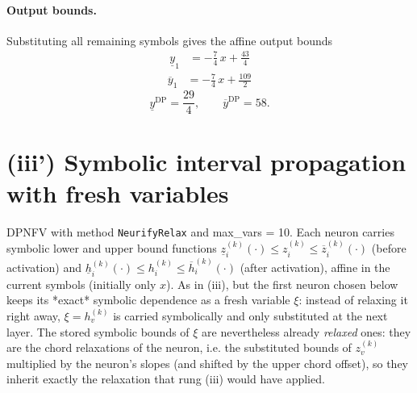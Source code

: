 \documentclass[11pt]{article}
\begin{document}
\paragraph{Output bounds.}
Substituting all remaining symbols gives the affine output bounds
\begin{align*}
\underline{y}_{1} &= -\frac{7}{4}\,x + \frac{43}{4}
\end{align*}
\begin{align*}
\overline{y}_{1} &= -\frac{7}{4}\,x + \frac{109}{2}
\end{align*}
\begin{equation*}
\underline{y}^{\text{DP}} = \frac{29}{4}, \qquad \overline{y}^{\text{DP}} = 58.
\end{equation*}

\section{(iii') Symbolic interval propagation with fresh variables}
DPNFV with method \texttt{NeurifyRelax} and max\_vars = 10. Each neuron carries symbolic lower and upper bound functions
$\underline{z}^{(k)}_i(\cdot) \le z^{(k)}_i \le \overline{z}^{(k)}_i(\cdot)$ (before activation)
and $\underline{h}^{(k)}_i(\cdot) \le h^{(k)}_i \le \overline{h}^{(k)}_i(\cdot)$ (after activation),
affine in the current symbols (initially only $x$).
As in (iii), but the first neuron chosen below keeps its *exact*
symbolic dependence as a fresh variable $\xi$: instead of relaxing it right away, $\xi = h^{(k)}_v$
is carried symbolically and only substituted at the next layer. The stored symbolic bounds of $\xi$
are nevertheless already \emph{relaxed} ones: they are the chord relaxations of the neuron, i.e.
the substituted bounds of $z^{(k)}_v$ multiplied by the neuron's slopes (and shifted by the upper
chord offset), so they inherit exactly the relaxation that rung (iii) would have applied.
\end{document}
